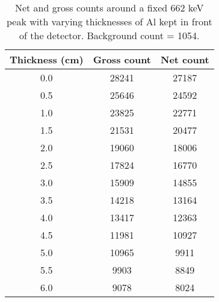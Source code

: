 \begin{table}[]
    \centering
    \begin{tabular}{|c|c|c|}
    \hline
    Thickness (cm) & Gross count & Net count \\ \hline
    0.0 & 28241 & 27187 \\ \hline
    0.5 & 25646 & 24592 \\ \hline
    1.0 & 23825 & 22771 \\ \hline
    1.5 & 21531 & 20477 \\ \hline
    2.0 & 19060 & 18006 \\ \hline
    2.5 & 17824 & 16770 \\ \hline
    3.0 & 15909 & 14855 \\ \hline
    3.5 & 14218 & 13164 \\ \hline
    4.0 & 13417 & 12363 \\ \hline
    4.5 & 11981 & 10927 \\ \hline
    5.0 & 10965 & 9911 \\ \hline
    5.5 & 9903 & 8849 \\ \hline
    6.0 & 9078 & 8024 \\ \hline
    \end{tabular}
    \caption{Net and gross counts around a fixed 662 keV peak with varying thicknesses of Al kept in front of the detector. Background count = 1054.}
    \label{tab:al}
    \end{table}